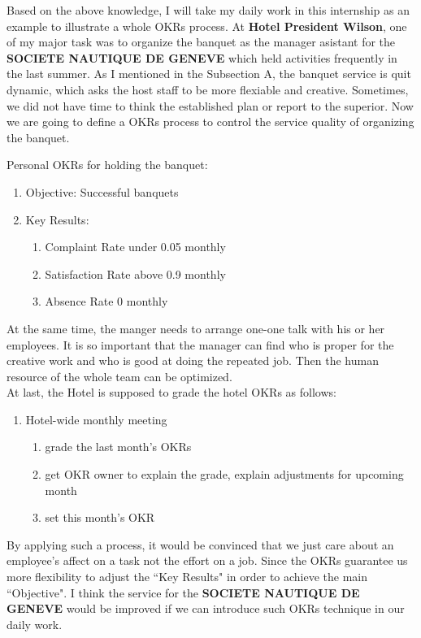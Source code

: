 \documentclass[12pt,onecolumn,a4paper]{IEEEtran}
\begin{document}
Based on the above knowledge, I will take my daily work in this internship as an example to illustrate a whole OKRs process. At \textbf{Hotel President Wilson}, one of my major task was to organize the banquet as the manager asistant for the \textbf{SOCIETE NAUTIQUE DE GENEVE} which held activities frequently in the last summer. As I mentioned in the Subsection A, the banquet service is quit dynamic, which asks the host staff to be more flexiable and creative. Sometimes, we did not have time to think the established plan or report to the superior. Now we are going to define a OKRs process to control the service quality of organizing the banquet.

\newpage

Personal OKRs for holding the banquet:

\begin{enumerate}
  \item Objective: Successful banquets
  \item Key Results:
  \begin{enumerate}
    \item Complaint Rate under 0.05 monthly
    \item Satisfaction Rate above 0.9 monthly
    \item Absence Rate 0 monthly
  \end{enumerate}
\end{enumerate}

At the same time, the manger needs to arrange one-one talk with his or her employees. It is so important that the manager can find who is proper for the creative work and who is good at doing the repeated job. Then the human resource of the whole team can be optimized.\\ 

At last, the Hotel is supposed to grade the hotel OKRs as follows:
\begin{enumerate}
  \item Hotel-wide monthly meeting\cite{OKRGV}
  \begin{enumerate}
    \item grade the last month's OKRs
    \item get OKR owner to explain the grade, explain adjustments for upcoming month
    \item set this month's OKR
  \end{enumerate}
\end{enumerate}

By applying such a process, it would be convinced that we just care about an employee's affect on a task not the effort on a job. Since the OKRs guarantee us more flexibility to adjust the ``Key Results" in order to achieve the main ``Objective". I think the service for the \textbf{SOCIETE NAUTIQUE DE GENEVE} would be improved if we can introduce such OKRs technique in our daily work.
\end{document}
